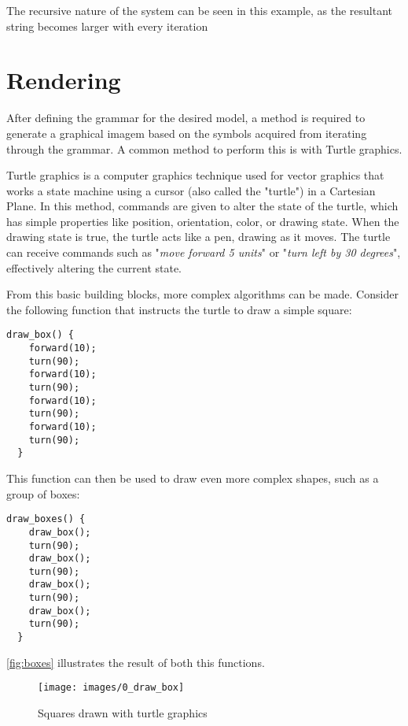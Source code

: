 \documentclass{acmtog}
\begin{document}
The recursive nature of the system can be seen in this example, as the resultant string becomes larger with every iteration

\section{Rendering}
\label{sec:rendering}

After defining the grammar for the desired model, a method is required to generate a graphical imagem based on the symbols acquired from iterating through the grammar. A common method to perform this is with Turtle graphics.

Turtle graphics is a computer graphics technique used for vector graphics that works a state machine using a cursor (also called the "turtle") in a Cartesian Plane. In this method, commands are given to alter the state of the turtle, which has simple properties like position, orientation, color, or drawing state. When the drawing state is true, the turtle acts like a pen, drawing as it moves. The turtle can receive commands such as "\textit{move forward 5 units}" or "\textit{turn left by 30 degrees}", effectively altering the current state.

From this basic building blocks, more complex algorithms can be made. Consider the following function that instructs the turtle to draw a simple square:

\begin{lstlisting}[label={lst:square}]
  draw_box() {
    forward(10);
    turn(90);
    forward(10);
    turn(90);
    forward(10);
    turn(90);
    forward(10);
    turn(90); 
  }
\end{lstlisting}

This function can then be used to draw even more complex shapes, such as a group of boxes:

\begin{lstlisting}[caption={},label={lst:squares}]
  draw_boxes() {
    draw_box();
    turn(90);
    draw_box();
    turn(90);
    draw_box();
    turn(90);
    draw_box();
    turn(90);
  }
\end{lstlisting}

\autoref{fig:boxes} illustrates the result of both this functions.

\begin{figure}[!htp]
  \begin{center}
    \texttt{[image: images/0\_draw\_box]}
    \caption{Squares drawn with turtle graphics \label{fig:boxes}}
    \end{center}
\end{figure}
\end{document}
